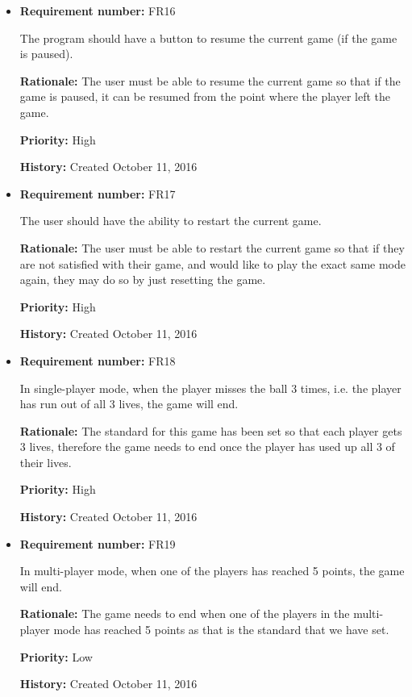 \documentclass[12pt,letterpaper]{article}
\begin{document}
\begin{reqbox}
	\begin{itemize}
		\item \textbf{Requirement number: }FR16

		The program should have a button to resume the current game (if the game is paused).

		\textbf{Rationale: }The user must be able to resume the current game so that if the game is paused, it can be resumed from the point where the player left the game.

		\textbf{Priority: }High
	
		\textbf{History: }Created October 11, 2016
	\end{itemize}
\end{reqbox}

\begin{reqbox}
	\begin{itemize}
		\item \textbf{Requirement number: }FR17

		The user should have the ability to restart the current game.

		\textbf{Rationale: }The user must be able to restart the current game so that if they are not satisfied with their game, and would like to play the exact same mode again, they may do so by just resetting the game.

		\textbf{Priority: }High

		\textbf{History: }Created October 11, 2016
	\end{itemize}
\end{reqbox}

\begin{reqbox}
	\begin{itemize}
		\item \textbf{Requirement number: }FR18

		In single-player mode, when the player misses the ball 3 times, i.e. the player has run out of all 3 lives, the game will end.

		\textbf{Rationale: }The standard for this game has been set so that each player gets 3 lives, therefore the game needs to end once the player has used up all 3 of their lives.

		\textbf{Priority: }High

		\textbf{History: }Created October 11, 2016
	\end{itemize}
\end{reqbox}

\begin{reqbox}
	\begin{itemize}
		\item \textbf{Requirement number: }FR19

		In multi-player mode, when one of the players has reached 5 points, the game will end.

		\textbf{Rationale: }The game needs to end when one of the players in the multi-player mode has reached 5 points as that is the standard that we have set.

		\textbf{Priority: }Low

		\textbf{History: }Created October 11, 2016
	\end{itemize}
\end{reqbox}
\end{document}
